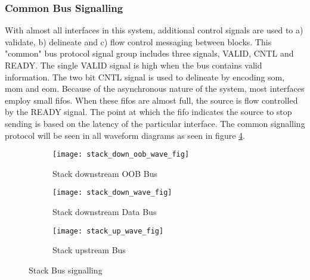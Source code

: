 \subsubsection{Common Bus Signalling}
\label{sec:Common Bus Signalling}

With almost all interfaces in this system, additional control signals are used to a) validate, b) delineate and c) flow control messaging between blocks.
This "common" bus protocol signal group includes three signals, VALID, CNTL and READY. 
The single VALID signal is high when the bus contains valid information. The two bit CNTL signal is used to delineate by encoding \ac{som}, \ac{mom} and \ac{eom}.
Because of the asynchronous nature of the system, most interfaces employ small \acp{fifo}. When these \acp{fifo} are almost full, the source is flow controlled by the READY signal. 
The point at which the \ac{fifo} indicates the source to stop sending is based on the latency of the particular interface. 
The common signalling protocol will be seen in all waveform diagrams as seen in figure \ref{fig:Stack Bus signalling}.


\begin{figure}
\centering
\begin{subfigure}{.9\textwidth}
  \centering
  \texttt{[image: stack\_down\_oob\_wave\_fig]}
  \captionsetup{justification=centering, skip=10pt}
  \caption{Stack downstream OOB Bus}
  \label{fig:Stack downstream OOB Bus}
\end{subfigure}%

\bigskip

\begin{subfigure}{.9\textwidth}
  \centering
  \texttt{[image: stack\_down\_wave\_fig]}
  \captionsetup{justification=centering, skip=10pt}
  \caption{Stack downstream Data Bus}
  \label{fig:Stack downstream Data Bus}
\end{subfigure}%

\bigskip

\begin{subfigure}{.9\textwidth}
  \centering
  \texttt{[image: stack\_up\_wave\_fig]}
  \captionsetup{justification=centering, skip=10pt}
  \caption{Stack upstream Bus}
  \label{fig:Stack upstream Bus}
\end{subfigure}%

\captionsetup{justification=centering, skip=16pt}
\caption{Stack Bus signalling}
\label{fig:Stack Bus signalling}
\end{figure}



